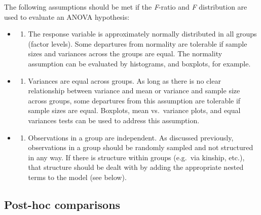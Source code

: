 \documentclass[]{book}
\providecommand{\tightlist}{%
  \setlength{\itemsep}{0pt}\setlength{\parskip}{0pt}}
\begin{document}
The following assumptions should be met if the \emph{F}-ratio and \emph{F} distribution are used to evaluate an ANOVA hypothesis:

\begin{itemize}
\item
  \begin{enumerate}
  \def\labelenumi{\arabic{enumi}.}
  \tightlist
  \item
    The response variable is approximately normally distributed in all groups (factor levels). Some departures from normality are tolerable if sample sizes and variances across the groups are equal. The normality assumption can be evaluated by histograms, and boxplots, for example.
  \end{enumerate}
\item
  \begin{enumerate}
  \def\labelenumi{\arabic{enumi}.}
  \setcounter{enumi}{1}
  \tightlist
  \item
    Variances are equal across groups. As long as there is no clear relationship between variance and mean or variance and sample size across groups, some departures from this assumption are tolerable if sample sizes are equal. Boxplots, mean vs.~variance plots, and equal variances tests can be used to address this assumption.
  \end{enumerate}
\item
  \begin{enumerate}
  \def\labelenumi{\arabic{enumi}.}
  \setcounter{enumi}{2}
  \tightlist
  \item
    Observations in a group are independent. As discussed previously, observations in a group should be randomly sampled and not structured in any way. If there is structure within groups (e.g.~via kinship, etc.), that structure should be dealt with by adding the appropriate nested terms to the model (see below).
  \end{enumerate}
\end{itemize}

\hypertarget{post-hoc-comparisons}{%
\subsection{Post-hoc comparisons}\label{post-hoc-comparisons}}
\end{document}
